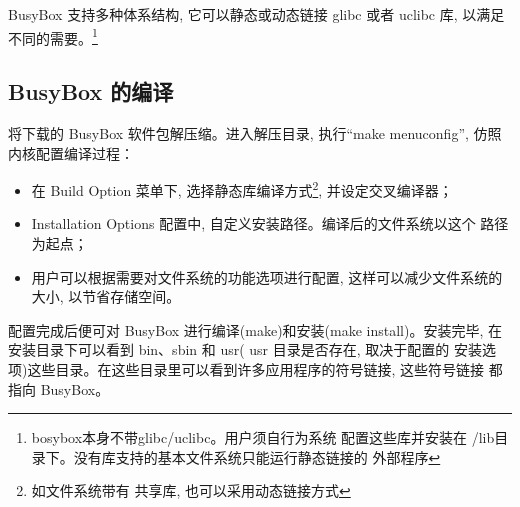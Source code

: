 	BusyBox 支持多种体系结构, 它可以静态或动态链接 glibc 或者 uclibc 库, 
以满足不同的需要。\footnote{bosybox本身不带glibc/uclibc。用户须自行为系统
配置这些库并安装在 /lib目录下。没有库支持的基本文件系统只能运行静态链接的
外部程序}

\subsection{BusyBox 的编译}
	将下载的 BusyBox 软件包解压缩。进入解压目录, 执行``make menuconfig'', 
仿照内核配置编译过程：
\begin{itemize}\itemsep=-3pt
  \item 在 Build Option 菜单下, 选择静态库编译方式\footnote{如文件系统带有
		共享库, 也可以采用动态链接方式}, 并设定交叉编译器；
  \item Installation Options 配置中, 自定义安装路径。编译后的文件系统以这个
		路径为起点；
  \item 用户可以根据需要对文件系统的功能选项进行配置, 这样可以减少文件系统的
		大小, 以节省存储空间。
\end{itemize}
	配置完成后便可对 BusyBox 进行编译(make)和安装(make install)。安装完毕, 
在安装目录下可以看到 bin、sbin 和 usr( usr 目录是否存在, 取决于配置的
安装选项)这些目录。在这些目录里可以看到许多应用程序的符号链接, 这些符号链接
都指向 BusyBox。

